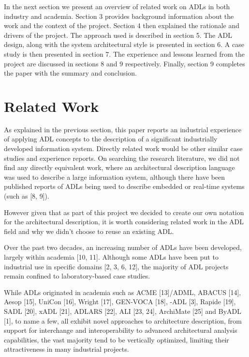   In the next section we present an overview of related work on ADLs in both industry and academia. Section 3 provides background information about the work and the context of the project. Section 4 then explained the rationale and drivers of the project. The approach used is described in section 5. The ADL design, along with the system architectural style is presented in section 6. A case study is then presented in section 7. The experience and lessons learned from the project are discussed in sections 8 and 9 respectively. Finally, section 9 completes the paper with the summary and conclusion. 

\section{Related Work}

  As explained in the previous section, this paper reports an industrial experience of applying ADL concepts to the description of a significant industrially developed information system.  Directly related work would be other similar case studies and experience reports.  On searching the research literature, we did not find any directly equivalent work, where an architectural description language was used to describe a large information system, although there have been published reports of ADLs being used to describe embedded or real-time systems (such as [8, 9]).

  However given that as part of this project we decided to create our own notation for the architectural description, it is worth considering related work in the ADL field and why we didn't choose to reuse an existing ADL.

  Over the past two decades, an increasing number of ADLs have been developed, largely within academia [10, 11]. Although some ADLs have been put to industrial use in specific domains [2, 3, 6, 12], the majority of ADL projects remain confined to laboratory-based case studies.

  While ADLs originated in academia such as ACME [13]/ADML, ABACUS [14], Aesop [15], UniCon [16], Wright [17], GEN-VOCA [18], \pi-ADL [3], Rapide [19], SADL [20], xADL [21], ADLARS [22], ALI [23, 24], ArchiMate [25] and ByADL [1], to name a few, all exhibit novel approaches to architecture description, from support for interchange and interoperability to advanced architectural analysis capabilities, the vast majority tend to be vertically optimized, limiting their attractiveness in many industrial projects.  

